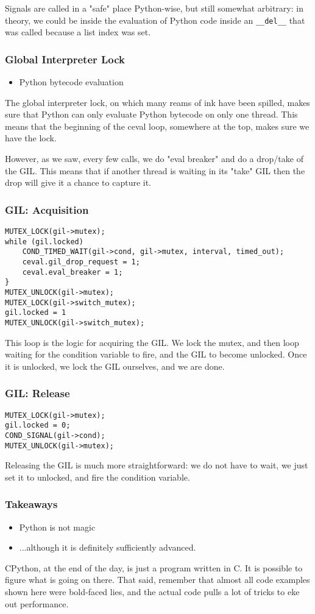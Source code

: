 Signals are called in a
"safe"
place Python-wise,
but still somewhat arbitrary:
in theory,
we could be inside the evaluation of Python code inside
an \verb|__del__| that was called because a list index was set.


\begin{frame}
\frametitle{Global Interpreter Lock}

\begin{itemize}
\item Python bytecode evaluation
\end{itemize}
\end{frame}

The global interpreter lock,
on which many reams of ink have been spilled,
makes sure that Python can only evaluate Python bytecode
on only one thread.
This means that the beginning of the ceval loop,
somewhere at the top,
makes sure we have the lock.

However,
as we saw,
every few calls,
we do "eval breaker"
and do a drop/take of the GIL.
This means that if another thread is waiting in its
"take"
GIL then the drop will give it a chance to capture it.

\begin{frame}
\frametitle{GIL: Acquisition}
\begin{lstlisting}
MUTEX_LOCK(gil->mutex);
while (gil.locked)
    COND_TIMED_WAIT(gil->cond, gil->mutex, interval, timed_out);
    ceval.gil_drop_request = 1;
    ceval.eval_breaker = 1;
}
MUTEX_UNLOCK(gil->mutex);
MUTEX_LOCK(gil->switch_mutex);
gil.locked = 1
MUTEX_UNLOCK(gil->switch_mutex);
\end{lstlisting}
\end{frame}

This loop is the logic for acquiring the GIL.
We lock the mutex,
and then loop waiting for the condition variable to fire,
and the GIL to become unlocked.
Once it is unlocked,
we lock the GIL ourselves,
and we are done.


\begin{frame}
\frametitle{GIL: Release}
\begin{lstlisting}
MUTEX_LOCK(gil->mutex);
gil.locked = 0;
COND_SIGNAL(gil->cond);
MUTEX_UNLOCK(gil->mutex);
\end{lstlisting}
\end{frame}

Releasing the GIL is much more straightforward:
we do not have to wait,
we just set it to unlocked,
and fire the condition variable.

\begin{frame}
\frametitle{Takeaways}

\begin{itemize}
\item Python is not magic\pause
\item ...although it is definitely sufficiently advanced.
\end{itemize}
\end{frame}

CPython,
at the end of the day,
is just a program written in C.
It is possible to figure what is going on there.
That said,
remember that almost all code examples shown here were
bold-faced lies,
and the actual code pulls a lot of tricks to eke out performance.


